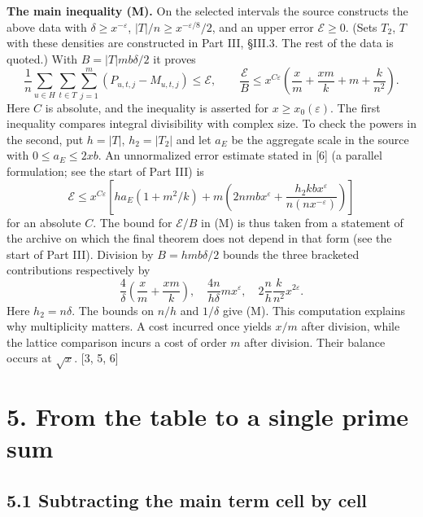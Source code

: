 \documentclass[11pt,letterpaper]{article}
\begin{document}
{\textbf{The main inequality (M).} On the selected intervals the source constructs the above data with $\delta\ge x^{-\varepsilon}$, $|T|/n\ge x^{-\varepsilon/8}/2$, and an upper error $\mathcal E\ge0$. (Sets $T_2$, $T$ with these densities are constructed in Part III, \S III.3. The rest of the data is quoted.) With $B=|T|mb\delta/2$ it proves
\begin{equation}\label{D:56}
 \frac1n\sum_{u\in H}\sum_{t\in T}\sum_{j=1}^m(P_{u,t,j}-M_{u,t,j})\le\mathcal E,\qquad
 \frac{\mathcal E}{B}\le x^{C\varepsilon}
 \left(\frac{x}{m}+\frac{xm}{k}+m+\frac{k}{n^2}\right).          \tag{M}
\end{equation}
Here $C$ is absolute, and the inequality is asserted for $x\ge x_0(\varepsilon)$. The first inequality compares integral divisibility with complex size. To check the powers in the second, put $h=|T|$, $h_2=|T_2|$ and let $a_E$ be the aggregate scale in the source with $0\le a_E\le2xb$. An unnormalized error estimate stated in [6] (a parallel formulation; see the start of Part III) is
\begin{equation}\label{D:57}
 \mathcal E\le x^{C\varepsilon}\left[
 h a_E(1+m^2/k)+m\left(2nmbx^\varepsilon+
                 \frac{h_2kb x^\varepsilon}{n(n x^{-\varepsilon})}\right)\right]
\end{equation}
for an absolute $C$. The bound for $\mathcal E/B$ in (M) is thus taken from a statement of the archive on which the final theorem does not depend in that form (see the start of Part III). Division by $B=hmb\delta/2$ bounds the three bracketed contributions respectively by
\begin{equation}\label{D:58}
 \frac4\delta\left(\frac{x}{m}+\frac{xm}{k}\right),\quad
 \frac{4n}{h\delta}mx^\varepsilon,\quad
 2\frac{n}{h}\frac{k}{n^2}x^{2\varepsilon}.
\end{equation}
Here $h_2=n\delta$. The bounds on $n/h$ and $1/\delta$ give (M). This computation explains why multiplicity matters. A cost incurred once yields $x/m$ after division, while the lattice comparison incurs a cost of order $m$ after division. Their balance occurs at $\sqrt{x}$. [3, 5, 6]

\newpage
\section*{5. From the table to a single prime sum}

\subsection*{5.1 Subtracting the main term cell by cell}

}
\end{document}
